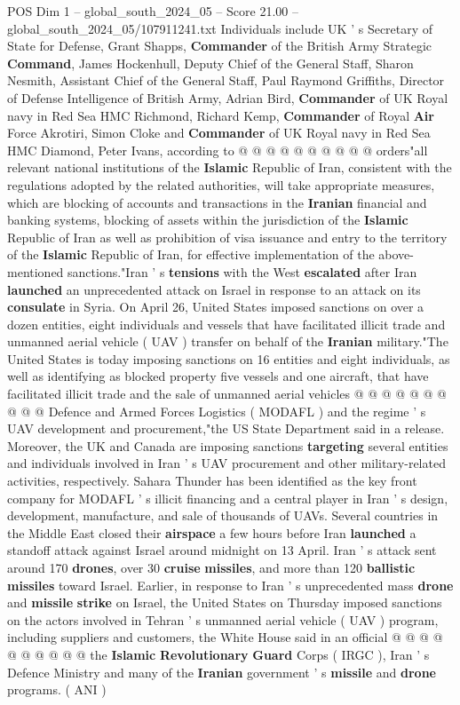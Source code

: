 \begin{textsample}{POS Dim 1 – global\_south\_2024\_05 – Score 21.00 – global\_south\_2024\_05/107911241.txt}
Individuals include UK ' s Secretary of State for Defense, Grant Shapps, \textbf{Commander} of the British Army Strategic \textbf{Command}, James Hockenhull, Deputy Chief of the General Staff, Sharon Nesmith, Assistant Chief of the General Staff, Paul Raymond Griffiths, Director of Defense Intelligence of British Army, Adrian Bird, \textbf{Commander} of UK Royal navy in Red Sea HMC Richmond, Richard Kemp, \textbf{Commander} of Royal \textbf{Air} Force Akrotiri, Simon Cloke and \textbf{Commander} of UK Royal navy in Red Sea HMC Diamond, Peter Ivans, according to @ @ @ @ @ @ @ @ @ @ orders"all relevant national institutions of the \textbf{Islamic} Republic of Iran, consistent with the regulations adopted by the related authorities, will take appropriate measures, which are blocking of accounts and transactions in the \textbf{Iranian} financial and banking systems, blocking of assets within the jurisdiction of the \textbf{Islamic} Republic of Iran as well as prohibition of visa issuance and entry to the territory of the \textbf{Islamic} Republic of Iran, for effective implementation of the above-mentioned sanctions."Iran ' s \textbf{tensions} with the West \textbf{escalated} after Iran \textbf{launched} an unprecedented attack on Israel in response to an attack on its \textbf{consulate} in Syria.
On April 26, United States imposed sanctions on over a dozen entities, eight individuals and vessels that have facilitated illicit trade and unmanned aerial vehicle ( UAV ) transfer on behalf of the \textbf{Iranian} military."The United States is today imposing sanctions on 16 entities and eight individuals, as well as identifying as blocked property five vessels and one aircraft, that have facilitated illicit trade and the sale of unmanned aerial vehicles @ @ @ @ @ @ @ @ @ @ Defence and Armed Forces Logistics ( MODAFL ) and the regime ' s UAV development and procurement,"the US State Department said in a release.
Moreover, the UK and Canada are imposing sanctions \textbf{targeting} several entities and individuals involved in Iran ' s UAV procurement and other military-related activities, respectively.
Sahara Thunder has been identified as the key front company for MODAFL ' s illicit financing and a central player in Iran ' s design, development, manufacture, and sale of thousands of UAVs.
Several countries in the Middle East closed their \textbf{airspace} a few hours before Iran \textbf{launched} a standoff attack against Israel around midnight on 13 April.
Iran ' s attack sent around 170 \textbf{drones}, over 30 \textbf{cruise} \textbf{missiles}, and more than 120 \textbf{ballistic} \textbf{missiles} toward Israel.
Earlier, in response to Iran ' s unprecedented mass \textbf{drone} and \textbf{missile} \textbf{strike} on Israel, the United States on Thursday imposed sanctions on the actors involved in Tehran ' s unmanned aerial vehicle ( UAV ) program, including suppliers and customers, the White House said in an official @ @ @ @ @ @ @ @ @ @ the \textbf{Islamic} \textbf{Revolutionary} \textbf{Guard} Corps ( IRGC ), Iran ' s Defence Ministry and many of the \textbf{Iranian} government ' s \textbf{missile} and \textbf{drone} programs. ( ANI )


\end{textsample}
